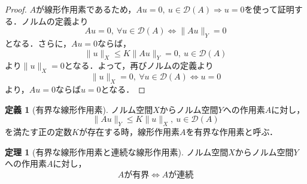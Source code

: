 \documentclass[11pt,a4paper,titlepage]{jsreport}
\theoremstyle{definition}
\newtheorem{dfn}{定義}
\newtheorem{thm}{定理}
\begin{document}
\begin{proof}
  $A$が線形作用素であるため，$Au=0,\ u\in\mathcal{D}(A)\Rightarrow u=0$を使って証明する．ノルムの定義より
  \begin{equation*}
    Au=0,\ \forall u\in\mathcal{D}(A)\Leftrightarrow\|Au\|_Y=0
  \end{equation*}
  となる．さらに，$Au=0$ならば，
  \begin{equation*}
    \|u\|_X \leq K\|Au\|_Y=0,\ u\in\mathcal{D}(A)
  \end{equation*}
  より$\|u\|_X=0$となる．よって，再びノルムの定義より
  \begin{equation*}
    \|u\|_X=0,\ \forall u\in\mathcal{D}(A)\Leftrightarrow u=0
  \end{equation*}
  より，$Au=0$ならば$u=0$となる．
\end{proof}

\begin{dfn}[有界な線形作用素]
  ノルム空間$X$からノルム空間$Y$への作用素$A$に対し，
  \begin{equation*}
    \|Au\|_Y\leq K\|u\|_X,\ u \in \mathcal{D}(A)
  \end{equation*}
  を満たす正の定数$K$が存在する時，線形作用素$A$を有界な作用素と呼ぶ．
\end{dfn}

\begin{thm}[有界な線形作用素と連続な線形作用素]
  ノルム空間$X$からノルム空間$Y$への作用素$A$に対し，
  \begin{equation*}
    Aが有界\Leftrightarrow Aが連続
  \end{equation*}
\end{thm}
\end{document}
